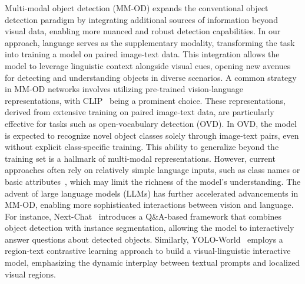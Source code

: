 Multi-modal object detection (MM-OD) expands the conventional object detection paradigm by integrating additional sources of information beyond visual data, enabling more nuanced and robust detection capabilities. In our approach, language serves as the supplementary modality, transforming the task into training a model on paired image-text data. This integration allows the model to leverage linguistic context alongside visual cues, opening new avenues for detecting and understanding objects in diverse scenarios.
A common strategy in MM-OD networks involves utilizing pre-trained vision-language representations, with CLIP~\cite{Radford2021CLIP} being a prominent choice. These representations, derived from extensive training on paired image-text data, are particularly effective for tasks such as open-vocabulary detection (OVD). In OVD, the model is expected to recognize novel object classes solely through image-text pairs, even without explicit class-specific training. This ability to generalize beyond the training set is a hallmark of multi-modal representations. However, current approaches often rely on relatively simple language inputs, such as class names or basic attributes~\cite{gu2022openvocabulary}, which may limit the richness of the model's understanding.
The advent of large language models (LLMs) has further accelerated advancements in MM-OD, enabling more sophisticated interactions between vision and language. For instance, Next-Chat~\cite{zhang2023nextchat} introduces a Q\&A-based framework that combines object detection with instance segmentation, allowing the model to interactively answer questions about detected objects. Similarly, YOLO-World~\cite{cheng2024yoloworld} employs a region-text contrastive learning approach to build a visual-linguistic interactive model, emphasizing the dynamic interplay between textual prompts and localized visual regions.

 

